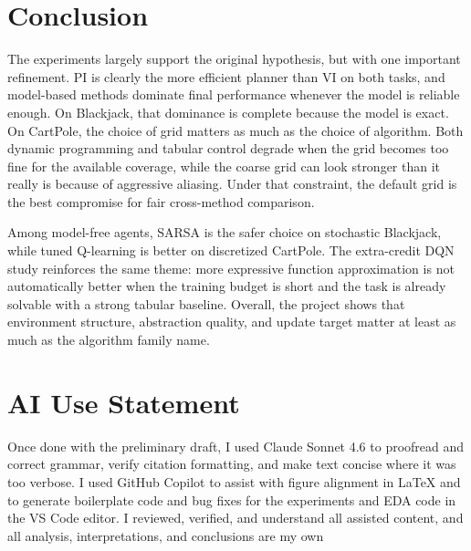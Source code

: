 \documentclass[letterpaper, 10 pt, conference]{ieeeconf}
\begin{document}
\section{Conclusion}

The experiments largely support the original hypothesis, but with one important refinement. PI is clearly the more efficient planner than VI on both tasks, and model-based methods dominate final performance whenever the model is reliable enough. On Blackjack, that dominance is complete because the model is exact. On CartPole, the choice of grid matters as much as the choice of algorithm. Both dynamic programming and tabular control degrade when the grid becomes too fine for the available coverage, while the coarse grid can look stronger than it really is because of aggressive aliasing. Under that constraint, the default grid is the best compromise for fair cross-method comparison.

Among model-free agents, SARSA is the safer choice on stochastic Blackjack, while tuned Q-learning is better on discretized CartPole. The extra-credit DQN study reinforces the same theme: more expressive function approximation is not automatically better when the training budget is short and the task is already solvable with a strong tabular baseline. Overall, the project shows that environment structure, abstraction quality, and update target matter at least as much as the algorithm family name.

\section*{AI Use Statement}

Once done with the preliminary draft, I used Claude Sonnet 4.6 to proofread and correct grammar, verify citation formatting, and make text concise where it was too verbose. I used GitHub Copilot to assist with figure alignment in LaTeX and to generate boilerplate code and bug fixes for the experiments and EDA code in the VS Code editor. I reviewed, verified, and understand all assisted content, and all analysis, interpretations, and conclusions are my own



\end{document}
